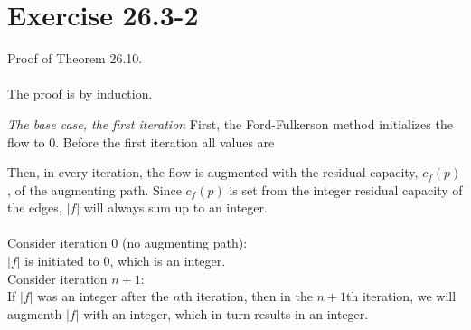 \section{Exercise 26.3-2}
Proof of Theorem 26.10.
\\
\\
The proof is by induction. 

\emph{The base case, the first iteration}
First, the Ford-Fulkerson method initializes the flow to 0. Before the first iteration all values are 


Then, in every iteration, the flow is augmented with the residual capacity, $c_f(p)$, of the augmenting path. Since $c_f(p)$ is set from 
the integer residual capacity of the edges, $|f|$ will always sum up to an integer.
\\
\\
Consider iteration $0$ (no augmenting path):
\\
$|f|$ is initiated to $0$, which is an integer.
\\
Consider iteration $n+1$:
\\
If $|f|$ was an integer after the $n$th iteration, then in the $n+1$th iteration, we will augmenth 
$|f|$ with an integer, which in turn results in an integer.